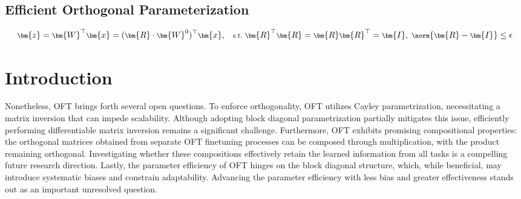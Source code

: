 \begin{itemize}[leftmargin=*,nosep]
\subsection{Efficient Orthogonal Parameterization}\label{sect:eff_ortho}

\begin{equation}\label{eq:coft_general}
    \footnotesize
    \bm{z}=\bm{W}^\top\bm{x}=(\bm{R}\cdot\bm{W}^0)^\top\bm{x},~~~\text{s.t.}~\bm{R}^\top\bm{R}=\bm{R}\bm{R}^\top=\bm{I},~\norm{\bm{R}-\bm{I}}\leq \epsilon
\end{equation}

\section{Introduction}

Nonetheless, OFT brings forth several open questions. To enforce orthogonality, OFT utilizes Cayley parametrization, necessitating a matrix inversion that can impede scalability. Although adopting block diagonal parametrization partially mitigates this issue, efficiently performing differentiable matrix inversion remains a significant challenge. Furthermore, OFT exhibits promising compositional properties: the orthogonal matrices obtained from separate OFT finetuning processes can be composed through multiplication, with the product remaining orthogonal. Investigating whether these compositions effectively retain the learned information from all tasks is a compelling future research direction. Lastly, the parameter efficiency of OFT hinges on the block diagonal structure, which, while beneficial, may introduce systematic biases and constrain adaptability. Advancing the parameter efficiency with less bias and greater effectiveness stands out as an important unresolved question.


\end{itemize}
